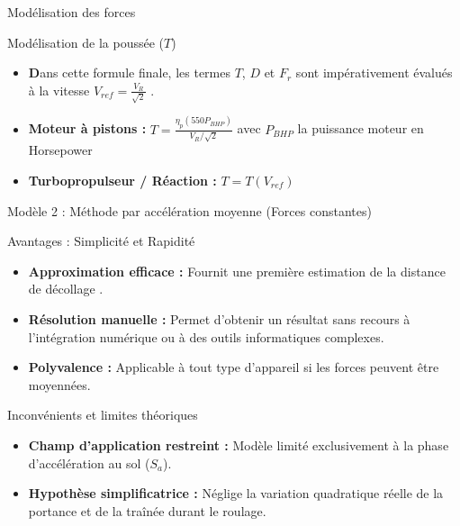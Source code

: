 		\begin{frame}{Modélisation des forces }
			\begin{block}{Modélisation de la poussée ($T$)}
			
		
			\begin{itemize}
				\item 	\textbf Dans cette formule finale, les termes $T$, $D$ et $F_r$ sont impérativement évalués à la vitesse $V_{ref} = \frac{V_R}{\sqrt{2}}$ .
				\item \textbf{Moteur à pistons :} $T = \frac{\eta_p (550 P_{BHP})}{V_R / \sqrt{2}}$ avec $ P_{BHP}$ la puissance moteur en Horsepower
				\item \textbf{Turbopropulseur / Réaction :} $T = T(V_{ref})$
			\end{itemize}
			
			\end{block}
			
			
			
			
		\end{frame}
		
			
			
			
			
		
			\begin{frame}{Modèle 2 : Méthode par accélération moyenne (Forces constantes)}

				
				\begin{block}{Avantages : Simplicité et Rapidité}
					\begin{itemize}
						\item \textbf{Approximation efficace :} Fournit une première estimation de la distance de décollage .
						\item \textbf{Résolution manuelle :} Permet d'obtenir un résultat sans recours à l'intégration numérique ou à des outils informatiques complexes.
						\item \textbf{Polyvalence :} Applicable à tout type d'appareil si les forces peuvent être moyennées.
					\end{itemize}
				\end{block}
				
				\begin{alertblock}{Inconvénients et limites théoriques}
					\begin{itemize}
						\item \textbf{Champ d'application restreint :} Modèle limité exclusivement à la phase d'accélération au sol ($S_a$).
						\item \textbf{Hypothèse simplificatrice :} Néglige la variation quadratique réelle de la portance et de la traînée durant le roulage.
					\end{itemize}
				\end{alertblock}
			\end{frame}
			

